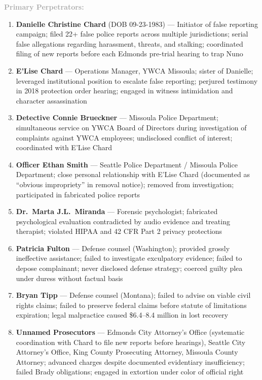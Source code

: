 \documentclass[11pt, letterpaper]{article}
\newcommand{\subsubsectiontitle}[1]{\vspace{0.1in}\noindent\textcolor{DarkGray}{\textbf{#1}}\vspace{0.05in}}
\begin{document}
\subsubsectiontitle{Primary Perpetrators:}
\begin{enumerate}[leftmargin=*,itemsep=3pt]
    \item \textbf{Danielle Christine Chard} (DOB 09-23-1983) --- Initiator of false reporting campaign; filed 22+ false police reports across multiple jurisdictions; serial false allegations regarding harassment, threats, and stalking; coordinated filing of new reports before each Edmonds pre-trial hearing to trap Nuno
    \item \textbf{E'Lise Chard} --- Operations Manager, YWCA Missoula; sister of Danielle; leveraged institutional position to escalate false reporting; perjured testimony in 2018 protection order hearing; engaged in witness intimidation and character assassination
    \item \textbf{Detective Connie Brueckner} --- Missoula Police Department; simultaneous service on YWCA Board of Directors during investigation of complaints against YWCA employees; undisclosed conflict of interest; coordinated with E'Lise Chard
    \item \textbf{Officer Ethan Smith} --- Seattle Police Department / Missoula Police Department; close personal relationship with E'Lise Chard (documented as ``obvious impropriety'' in removal notice); removed from investigation; participated in fabricated police reports
    \item \textbf{Dr.\ Marta J.L.\ Miranda} --- Forensic psychologist; fabricated psychological evaluation contradicted by audio evidence and treating therapist; violated HIPAA and 42 CFR Part 2 privacy protections
    \item \textbf{Patricia Fulton} --- Defense counsel (Washington); provided grossly ineffective assistance; failed to investigate exculpatory evidence; failed to depose complainant; never disclosed defense strategy; coerced guilty plea under duress without factual basis
    \item \textbf{Bryan Tipp} --- Defense counsel (Montana); failed to advise on viable civil rights claims; failed to preserve federal claims before statute of limitations expiration; legal malpractice caused \$6.4--8.4 million in lost recovery
    \item \textbf{Unnamed Prosecutors} --- Edmonds City Attorney's Office (systematic coordination with Chard to file new reports before hearings), Seattle City Attorney's Office, King County Prosecuting Attorney, Missoula County Attorney; advanced charges despite documented evidentiary insufficiency; failed Brady obligations; engaged in extortion under color of official right
\end{enumerate}
\end{document}
